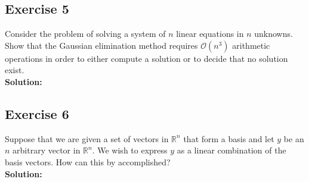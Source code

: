 \documentclass[12pt]{article}
\newcommand{\R}{\mathbb{R}}
\begin{document}
\newpage


\subsection*{Exercise 5}
Consider the problem of solving a system of $n$ linear equations in  $n$ unknowns. Show that the Gaussian elimination method requires $\mathcal{O}(n^3)$ arithmetic operations in order to either compute a solution or to decide that no solution exist.\\
\textbf{Solution:} \par

\newpage


\subsection*{Exercise 6}
Suppose that we are given a set of vectors in $\R^n$ that form a basis and let $y$ be an $n$ arbitrary vector in $\R^n$. We wish to express $y$ as a linear combination of the basis vectors. How can this by accomplished?\\
\textbf{Solution:} \par

\newpage

\end{document}
